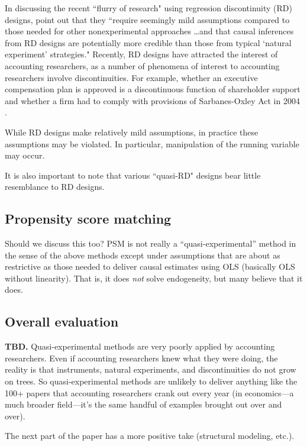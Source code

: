 \documentclass[11pt]{amsart}
\begin{document}
In discussing the recent ``flurry of research" using regression discontinuity (RD) designs, \citet[p.282]{Lee:2010hya} point out that they ``require seemingly mild assumptions compared to those needed for other nonexperimental approaches \dots and that causal inferences from RD designs are potentially more credible than those from typical `natural experiment' strategies." 
Recently, RD designs have attracted the interest of accounting researchers, as a number of phenomena of interest to accounting researchers involve discontinuities. For example, whether an executive compensation plan is approved is a discontinuous function of shareholder support \citet{Armstrong:2013io} and whether a firm had to comply with provisions of Sarbanes-Oxley Act in 2004 \citep{Iliev:2010ic}.

While RD designs make relatively mild assumptions, in practice these assumptions may be violated. In particular, manipulation of the running variable may occur.

It is also important to note that various ``quasi-RD" designs bear little resemblance to RD designs.

\subsection{Propensity score matching}

Should we discuss this too? PSM is not really a ``quasi-experimental'' method in the sense of the above methods except under assumptions that are about as restrictive as those needed to deliver causal estimates using OLS (basically OLS without linearity). That is, it does \emph{not} solve endogeneity, but many believe that it does.

\subsection{Overall evaluation} 
\textbf{TBD.} Quasi-experimental methods are very poorly applied by accounting researchers. Even if accounting researchers knew what they were doing, the reality is that instruments, natural experiments, and discontinuities do not grow on trees. So quasi-experimental methods are unlikely to deliver anything like the 100+ papers that accounting researchers crank out every year (in economics---a much broader field---it's the same handful of examples brought out over and over).

The next part of the paper has a more positive take (structural modeling, etc.).
\end{document}
